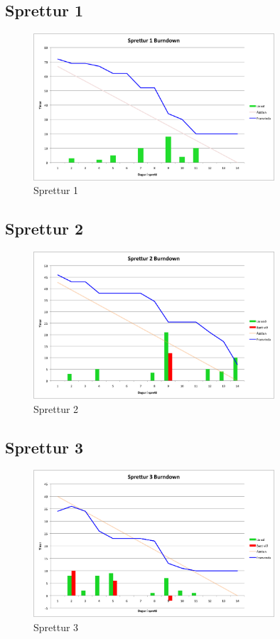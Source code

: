 \documentclass{article}
\begin{document}
\subsection{Sprettur 1}

\begin{figure}[H]
  \centering
  \includegraphics[width=0.8\textwidth]{Sprettur1_Burndown.png} 
  \caption{Sprettur 1} 
\end{figure}

\subsection{Sprettur 2}

\begin{figure}[H]
  \centering
  \includegraphics[width=0.8\textwidth]{Sprettur2_Burndown.png} 
  \caption{Sprettur 2} 
\end{figure}

\subsection{Sprettur 3}

\begin{figure}[H]
  \centering
  \includegraphics[width=0.8\textwidth]{Sprettur3_Burndown.png} 
  \caption{Sprettur 3} 
\end{figure}
\end{document}

